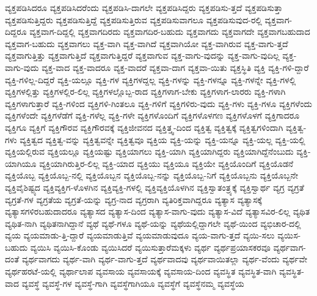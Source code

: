 {ವ್ಯಕ್ತಪಡಿಸಿದರೂ
ವ್ಯಕ್ತಪಡಿಸಿದರೆಂದು
ವ್ಯಕ್ತಪಡಿಸಿ-ದಾಗಲೇ
ವ್ಯಕ್ತಪಡಿಸಿದ್ದರು
ವ್ಯಕ್ತಪಡಿಸು-ತ್ತದೆ
ವ್ಯಕ್ತಪಡಿಸುತ್ತಾ
ವ್ಯಕ್ತಪಡಿಸುತ್ತಿದ್ದರು
ವ್ಯಕ್ತಪಡಿಸುತ್ತಿದ್ದೆ
ವ್ಯಕ್ತಪಡಿಸುತ್ತಿರುವ
ವ್ಯಕ್ತಪಡಿಸುವಾಗಲೂ
ವ್ಯಕ್ತಪಡಿಸುವುದ-ರಲ್ಲಿ
ವ್ಯಕ್ತವಾಗ-ದಿದ್ದರೂ
ವ್ಯಕ್ತವಾಗ-ದಿದ್ದಲ್ಲಿ
ವ್ಯಕ್ತವಾಗದಿರದು
ವ್ಯಕ್ತವಾಗದಿರ-ಬಹುದು
ವ್ಯಕ್ತವಾಗದು
ವ್ಯಕ್ತವಾಗದೇ
ವ್ಯಕ್ತವಾಗಬಹುದಾದ
ವ್ಯಕ್ತವಾಗ-ಬಹುದು
ವ್ಯಕ್ತವಾಗಲು
ವ್ಯಕ್ತ-ವಾಗಿ
ವ್ಯಕ್ತ-ವಾಗಿದೆ
ವ್ಯಕ್ತವಾಗಿಯೋ
ವ್ಯಕ್ತ-ವಾಗಿರುವ
ವ್ಯಕ್ತ-ವಾಗು-ತ್ತದೆ
ವ್ಯಕ್ತವಾಗುತ್ತಿತ್ತು
ವ್ಯಕ್ತವಾಗುತ್ತಿದೆ
ವ್ಯಕ್ತವಾಗುತ್ತಿದ್ದರೆ
ವ್ಯಕ್ತವಾಗುವ
ವ್ಯಕ್ತ-ವಾಗು-ವುದನ್ನು
ವ್ಯಕ್ತ-ವಾಗು-ವುದಿಲ್ಲ
ವ್ಯಕ್ತ-ವಾಗು-ವುದು
ವ್ಯಕ್ತ-ವಾದ
ವ್ಯಕ್ತ-ವಾದರೂ
ವ್ಯಕ್ತ-ವಾದರೆ
ವ್ಯಕ್ತವಾ-ದಾಗ
ವ್ಯಕ್ತವಾ-ಯಿತು
ವ್ಯಕ್ತಸ್ಥಿತಿ
ವ್ಯಕ್ತಿ
ವ್ಯಕ್ತಿ-ಗಳಿ-ದ್ದಾರೆ
ವ್ಯಕ್ತಿ-ಗಳಿಲ್ಲ-ದಿದ್ದರೆ
ವ್ಯಕ್ತಿ-ಯಲ್ಲೂ
ವ್ಯಕ್ತಿ-ಗಳ
ವ್ಯಕ್ತಿಗಳದ್ದಲ್ಲ
ವ್ಯಕ್ತಿ-ಗಳನ್ನು
ವ್ಯಕ್ತಿ-ಗಳನ್ನೂ
ವ್ಯಕ್ತಿ-ಗಳನ್ನೇ
ವ್ಯಕ್ತಿ-ಗಳಲ್ಲಿ
ವ್ಯಕ್ತಿಗಳಲ್ಲಿತ್ತು
ವ್ಯಕ್ತಿಗಳಲ್ಲಿರ-ಲಿಲ್ಲ
ವ್ಯಕ್ತಿಗಳಲ್ಲೊಬ್ಬ-ರಾದ
ವ್ಯಕ್ತಿಗಳಾಗ-ಬೇಕು
ವ್ಯಕ್ತಿಗಳಾಗ-ಲಾರರು
ವ್ಯಕ್ತಿ-ಗಳಾಗಿ
ವ್ಯಕ್ತಿಗಳಾಗುತ್ತಾರೆ
ವ್ಯಕ್ತಿ-ಗಳಿಂದ
ವ್ಯಕ್ತಿಗಳಿ-ಗಿಂತಲೂ
ವ್ಯಕ್ತಿ-ಗಳಿಗೆ
ವ್ಯಕ್ತಿಗಳಿರು-ವುದು
ವ್ಯಕ್ತಿ-ಗಳು
ವ್ಯಕ್ತಿ-ಗಳೂ
ವ್ಯಕ್ತಿಗಳೆಂದು
ವ್ಯಕ್ತಿಗಳೆಂದೇ
ವ್ಯಕ್ತಿಗಳೆಡೆಗೆ
ವ್ಯಕ್ತಿ-ಗಳೆಲ್ಲ
ವ್ಯಕ್ತಿ-ಗಳೇ
ವ್ಯಕ್ತಿಗಳೊಂದಿಗೆ
ವ್ಯಕ್ತಿಗಳೊಳಗಣ
ವ್ಯಕ್ತಿಗಳೊಳಗೆ
ವ್ಯಕ್ತಿಗಾದರೂ
ವ್ಯಕ್ತಿಗೂ
ವ್ಯಕ್ತಿಗೆ
ವ್ಯಕ್ತಿಗೌರವ
ವ್ಯಕ್ತಿಗೌರವಕ್ಕೆ
ವ್ಯಕ್ತಿಜೀವನದ
ವ್ಯಕ್ತಿತ್ತ್ವ-ದಿಂದ
ವ್ಯಕ್ತಿತ್ವ
ವ್ಯಕ್ತಿತ್ವಕ್ಕೆ
ವ್ಯಕ್ತಿತ್ವಗಳಿಂದಾಗಿ
ವ್ಯಕ್ತಿತ್ವ-ಗಳು
ವ್ಯಕ್ತಿತ್ವದ
ವ್ಯಕ್ತಿತ್ವ-ವನ್ನು
ವ್ಯಕ್ತಿತ್ವವನ್ನೇ
ವ್ಯಕ್ತಿತ್ವವೂ
ವ್ಯಕ್ತಿಯ
ವ್ಯಕ್ತಿ-ಯನ್ನು
ವ್ಯಕ್ತಿ-ಯನ್ನೂ
ವ್ಯಕ್ತಿ-ಯಲ್ಲ
ವ್ಯಕ್ತಿ-ಯಲ್ಲಿ
ವ್ಯಕ್ತಿಯಲ್ಲಿರುವ
ವ್ಯಕ್ತಿಯಲ್ಲೂ
ವ್ಯಕ್ತಿಯಷ್ಟು
ವ್ಯಕ್ತಿಯಾಗಲು
ವ್ಯಕ್ತಿ-ಯಾಗಿ
ವ್ಯಕ್ತಿಯಾಗಿದ್ದರು
ವ್ಯಕ್ತಿಯಾಗಿದ್ದೆನೆಂಬುದು
ವ್ಯಕ್ತಿ-ಯಾಗಿಯೂ
ವ್ಯಕ್ತಿಯಾಗಿರುತ್ತಿರ-ಲಿಲ್ಲ
ವ್ಯಕ್ತಿ-ಯಾದ
ವ್ಯಕ್ತಿಯು
ವ್ಯಕ್ತಿಯೂ
ವ್ಯಕ್ತಿಯೇ
ವ್ಯಕ್ತಿಯೊಂದಿಗೆ
ವ್ಯಕ್ತಿಯೊಡನೆ
ವ್ಯಕ್ತಿಯೊಬ್ಬ
ವ್ಯಕ್ತಿಯೊಬ್ಬ-ನಲ್ಲಿ
ವ್ಯಕ್ತಿಯೊಬ್ಬನ
ವ್ಯಕ್ತಿಯೊಬ್ಬ-ನನ್ನು
ವ್ಯಕ್ತಿಯೊಬ್ಬ-ನಿಗೆ
ವ್ಯಕ್ತಿಯೊಬ್ಬನು
ವ್ಯಕ್ತಿಯೊಬ್ಬನೇ
ವ್ಯಕ್ತಿವೈಶಿಷ್ಟ್ಯದ
ವ್ಯಕ್ತಿವ್ಯಕ್ತಿಗ-ಳೊಳಗಿನ
ವ್ಯಕ್ತಿವ್ಯಕ್ತಿ-ಗಳಲ್ಲಿ
ವ್ಯಕ್ತಿವ್ಯಕ್ತಿಯೊಳಗಿನ
ವ್ಯಕ್ತಿಸ್ವಾತಂತ್ರ್ಯಕ್ಕೆ
ವ್ಯಕ್ತಿಸ್ವಾರ್ಥ
ವ್ಯಗ್ರ
ವ್ಯಗ್ರತೆ
ವ್ಯಗ್ರತೆ-ಗಳ
ವ್ಯಗ್ರತೆಯ
ವ್ಯಗ್ರತೆ-ಯನ್ನು
ವ್ಯಗ್ರ-ನಾದ
ವ್ಯಗ್ರರಾಗಿ
ವ್ಯತಿರಿಕ್ತವಾಗಿದ್ದರೂ
ವ್ಯತ್ಯಾಸ
ವ್ಯತ್ಯಾಸಕ್ಕೆ
ವ್ಯತ್ಯಾಸಗಳಿರಬಹುದಾದರೂ
ವ್ಯತ್ಯಾಸದ
ವ್ಯತ್ಯಾಸ-ದಿಂದ
ವ್ಯತ್ಯಾಸ-ವಾಗು-ವುದು
ವ್ಯತ್ಯಾಸ-ವಿದೆ
ವ್ಯತ್ಯಾಸವಿರ-ಲಿಲ್ಲ
ವ್ಯಥಿತ
ವ್ಯಥಿತ-ನಾಗಿ
ವ್ಯಥಿತನಾಗಿದ್ದಾನೆ
ವ್ಯಥೆ
ವ್ಯಥೆ-ಗಳೂ
ವ್ಯಥೆ-ಯನ್ನು
ವ್ಯಥೆಯಲ್ಲಿದ್ದಾಗಲೇ
ವ್ಯಥೆ-ಯಿಂದ
ವ್ಯಭಿಚಾರ-ದಲ್ಲಿ
ವ್ಯಯ
ವ್ಯಯಮಾಡು-ತ್ತಿ-ದ್ದಾರೆ
ವ್ಯಯಮಾಡುತ್ತಿವೆ
ವ್ಯಯಮಾಡುವುದೂ
ವ್ಯಯ-ವಾಗು-ತ್ತದೆ
ವ್ಯಯಿ-ಸಲು
ವ್ಯಯಿಸ-ಬಹುದು
ವ್ಯಯಿಸಿ
ವ್ಯಯಿಸಿ-ಕೊಂಡು
ವ್ಯಯಿಸಿದರೆ
ವ್ಯಯಿಸುತ್ತಾರೆಮಕ್ಕಳು
ವ್ಯರ್ಥ
ವ್ಯರ್ಥಪ್ರಯಾಸಕರವೂ
ವ್ಯರ್ಥವಾಗ-ದಂತೆ
ವ್ಯರ್ಥವಾಗದು
ವ್ಯರ್ಥ-ವಾಗಿ
ವ್ಯರ್ಥ-ವಾಗು-ತ್ತದೆ
ವ್ಯರ್ಥವಾದವು
ವ್ಯರ್ಥವಾಯಿತಲ್ಲಾ
ವ್ಯರ್ಥ-ವೆಂದು
ವ್ಯರ್ಥವೇ
ವ್ಯರ್ಥಹರಟೆ-ಯಲ್ಲಿ
ವ್ಯರ್ಥಾಲಾಪ
ವ್ಯವಸಾಯ
ವ್ಯವಸಾಯಕ್ಕೆ
ವ್ಯವಸಾಯ-ದಿಂದ
ವ್ಯವಸ್ಥಿತ
ವ್ಯವಸ್ಥಿತ-ವಾಗಿ
ವ್ಯವಸ್ಥಿತ-ವಾದ
ವ್ಯವಸ್ಥೆ
ವ್ಯವಸ್ಥೆ-ಗಳ
ವ್ಯವಸ್ಥೆ-ಗಾಗಿ
ವ್ಯವಸ್ಥೆಗಾಗಿಯೂ
ವ್ಯವಸ್ಥೆಗೆ
ವ್ಯವಸ್ಥೆನಮ್ಮ
ವ್ಯವಸ್ಥೆಯ
}
